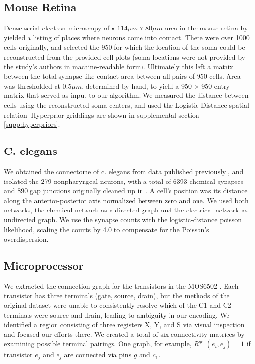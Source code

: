 \documentclass{nature}
\begin{document}
\subsection {Mouse Retina}
\label{supp:mouseretina}
Dense serial electron microscopy of a $114\mu m \times 80 \mu m $ area
in the mouse retina by \autocite{Helmstaedter2013} yielded a listing
of places where neurons come into contact. There were over 1000 cells
originally, and selected the $950$ for which the location of the soma
could be reconstructed from the provided cell plots (soma locations
were not provided by the study's authors in machine-readable
form). Ultimately this left a matrix between the total synapse-like
contact area between all pairs of 950 cells. Area was thresholded at
$0.5\mu m$, determined by hand, to yield a 950 $\times$ 950 entry
matrix that served as input to our algorithm. We measured the distance
between cells using the reconstructed soma centers, and used the
Logistic-Distance spatial relation. Hyperprior griddings are shown in
supplemental section \ref{supp:hyperpriors}.

\subsection{C. elegans}

We obtained the connectome of c. elegans from data published
previously \autocite{Varshney2011}, and isolated the 279 nonpharyngeal
neurons, with a total of 6393 chemical synapses and 890 gap junctions
originally cleaned up in \autocite{Chen2006}. A cell's position was
its distance along the anterior-posterior axis normalized between zero
and one. We used both networks, the chemical network as a directed
graph and the electrical network as undirected graph. We use the
synapse counts with the logistic-distance poisson likelihood, scaling
the counts by 4.0 to compensate for the Poisson's overdispersion.

\subsection{Microprocessor}
We extracted the connection graph for the transistors in the MOS6502
\autocite{visual6502source}. Each transistor has three terminals (gate,
source, drain), but the methods of the original dataset were unable to
consistently resolve which of the C1 and C2 terminals were source and
drain, leading to ambiguity in our encoding. We identified a region
consisting of three registers X, Y, and S via visual
inspection and focused our efforts there. We created a total of six
connectivity matrices by examining possible terminal pairings. One
graph, for example, $R^{gc_1}(e_i, e_j)=1$ if transistor $e_j$ and
$e_j$ are connected via pins $g$ and $c_1$. 
\end{document}
